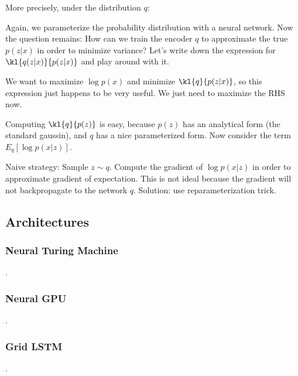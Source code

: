 \documentclass[12pt]{article}
\begin{document}

More precisely, under the distribution $q$:


Again, we parameterize the probability distribution with a neural network. Now the question remains: How can we train the encoder $q$ to approximate the true $p(z|x)$ in order to minimize variance? Let's write down the expression for $\kl{q(z|x)}{p(z|x)}$ and play around with it.


We want to maximize $\log p(x)$ and minimize $\kl{q}{p(z|x)}$, so this expression just happens to be very useful. We just need to maximize the RHS now.

Computing $\kl{q}{p(z)}$ is easy, because $p(z)$ has an analytical form (the standard gaussin), and $q$ has a nice parameterized form. Now consider the term $E_q[\log p(x|z)]$. 

Naive strategy: Sample $z \sim q$. Compute the gradient of $\log p(x|z)$ in order to approximate gradient of expectation. This is not ideal because the gradient will not backpropagate to the network $q$. Solution: use reparameterization trick.  

\subsection{Architectures}

\subsubsection{Neural Turing Machine}
.
\subsubsection{Neural GPU}
.
\subsubsection{Grid LSTM}
.
\end{document}

